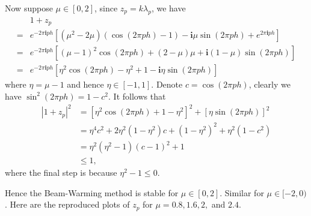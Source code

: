 \documentclass[twocolumn,10pt]{article}
\begin{document}
Now suppose $\mu\in[0,2]$, since $z_p=k\lambda_p$, we have
\begin{align*}
    &1+z_p \\
    =& e^{-2\pi\mathbf{i}ph}\left[(\mu^2-2\mu)(\cos(2\pi ph)-1)-\mathbf{i}\mu\sin(2\pi ph)+e^{2\pi\mathbf{i}ph}\right]\\
    =& e^{-2\pi\mathbf{i}ph}\left[ (\mu-1)^2\cos(2\pi ph) + (2-\mu)\mu + \mathbf{i}(1-\mu)\sin(2\pi ph)\right]\\
    =& e^{-2\pi\mathbf{i}ph}\left[ \eta^2\cos(2\pi ph) -\eta^2+1 -\mathbf{i}\eta\sin(2\pi ph)\right]
\end{align*}
where $\eta=\mu-1$ and hence $\eta\in[-1,1]$. Denote $c=\cos(2\pi ph)$, clearly we have $\sin^2(2\pi ph)=1-c^2$. It follows that
\begin{align*}
    |1+z_p|^2 &= \left[\eta^2\cos(2\pi ph)+1-\eta^2\right]^2 + \left[\eta \sin(2\pi ph)\right]^2\\
    &= \eta^4c^2+2\eta^2(1-\eta^2)c+(1-\eta^2)^2+\eta^2(1-c^2)\\
    &= \eta^2(\eta^2-1)(c-1)^2+1\\
    &\leq 1,
\end{align*}
where the final step is because $\eta^2-1\leq 0$.

Hence the Beam-Warming method is stable for $\mu\in[0,2]$. Similar for $\mu\in[-2,0)$. Here are the reproduced plots of $z_p$ for $\mu=0.8,1.6,2,$ and $2.4$.
\end{document}
